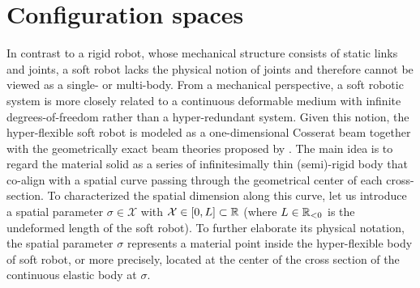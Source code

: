\section{Configuration spaces}
In contrast to a rigid robot, whose mechanical structure consists of static links and joints, a soft robot lacks the physical notion of joints and therefore cannot be viewed as a single- or multi-body. From a mechanical perspective, a soft robotic system is more closely related to a continuous deformable medium with infinite degrees-of-freedom rather than a hyper-redundant system. Given this notion, the hyper-flexible soft robot is modeled as a one-dimensional Cosserat beam together with the geometrically exact beam theories proposed by \cite{Simo1986}. The main idea is to regard the material solid as a series of infinitesimally thin (semi)-rigid body that co-align with a spatial curve passing through the geometrical center of each cross-section. To characterized the spatial dimension along this curve, let us introduce a spatial parameter $\sigma \in \mathcal{X}$ with $\mathcal{X} \in [0,L] \subset \mathbb{R}$ (where $L \in \operatorname{\mathbb{R}_{<0}}$ is the undeformed length of the soft robot). To further elaborate its physical notation, the spatial parameter $\sigma$ represents a material point inside the hyper-flexible body of soft robot, or more precisely, located at the center of the cross section of the continuous elastic body at $\sigma$. 